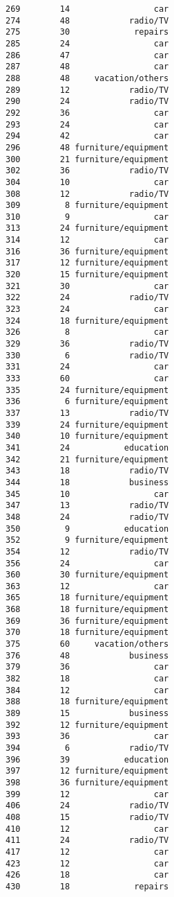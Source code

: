 \documentclass[
]{article}
\begin{document}
\begin{verbatim}
269        14                 car
274        48            radio/TV
275        30             repairs
285        24                 car
286        47                 car
287        48                 car
288        48     vacation/others
289        12            radio/TV
290        24            radio/TV
292        36                 car
293        24                 car
294        42                 car
296        48 furniture/equipment
300        21 furniture/equipment
302        36            radio/TV
304        10                 car
308        12            radio/TV
309         8 furniture/equipment
310         9                 car
313        24 furniture/equipment
314        12                 car
316        36 furniture/equipment
317        12 furniture/equipment
320        15 furniture/equipment
321        30                 car
322        24            radio/TV
323        24                 car
324        18 furniture/equipment
326         8                 car
329        36            radio/TV
330         6            radio/TV
331        24                 car
333        60                 car
335        24 furniture/equipment
336         6 furniture/equipment
337        13            radio/TV
339        24 furniture/equipment
340        10 furniture/equipment
341        24           education
342        21 furniture/equipment
343        18            radio/TV
344        18            business
345        10                 car
347        13            radio/TV
348        24            radio/TV
350         9           education
352         9 furniture/equipment
354        12            radio/TV
356        24                 car
360        30 furniture/equipment
363        12                 car
365        18 furniture/equipment
368        18 furniture/equipment
369        36 furniture/equipment
370        18 furniture/equipment
375        60     vacation/others
376        48            business
379        36                 car
382        18                 car
384        12                 car
388        18 furniture/equipment
389        15            business
392        12 furniture/equipment
393        36                 car
394         6            radio/TV
396        39           education
397        12 furniture/equipment
398        36 furniture/equipment
399        12                 car
406        24            radio/TV
408        15            radio/TV
410        12                 car
411        24            radio/TV
417        12                 car
423        12                 car
426        18                 car
430        18             repairs

\end{verbatim}
\end{document}

